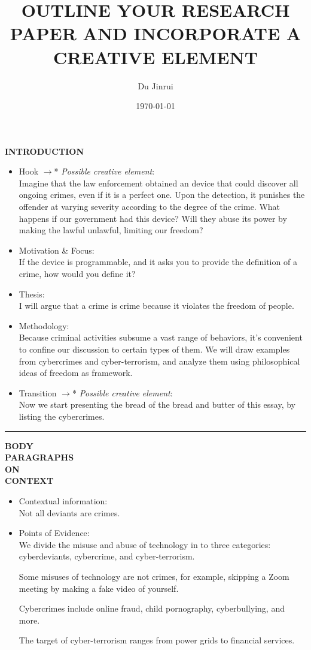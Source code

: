 \documentclass{article}
\title{OUTLINE YOUR RESEARCH PAPER AND INCORPORATE A CREATIVE ELEMENT}
\author{Du Jinrui}
\date{\today}
\begin{document}
\maketitle

\begin{paracol}{3}
	\switchcolumn[0]
	\noindent \textbf{INTRODUCTION}
	\switchcolumn[2]
	\begin{itemize}
	\item Hook $\to$* \textit{Possible creative element}:\\
	Imagine that the law enforcement obtained an device that could discover all ongoing crimes, even if it is a perfect one. Upon the detection, it punishes the offender at varying severity according to the degree of the crime. What happens if our government had this device? Will they abuse its power by making the lawful unlawful, limiting our freedom? 
	\item Motivation \& Focus:\\
	If the device is programmable, and it asks you to provide the definition of a crime, how would you define it?
	\item Thesis:\\
	I will argue that a crime is crime because it violates the freedom of people.
	\item Methodology:\\
	Because criminal activities subsume a vast range of behaviors, it's convenient to confine our discussion to certain types of them. We will draw examples from cybercrimes and cyber-terrorism, and analyze them using philosophical ideas of freedom as framework.
	\item Transition $\to$* \textit{Possible creative element}:\\
	Now we start presenting the bread of the bread and butter of this essay, by listing the cybercrimes.
	\end{itemize}
\end{paracol}
\noindent\rule{16cm}{0.4pt}
{}
\begin{paracol}{3}
	\switchcolumn[0]
	\noindent \textbf{BODY}\\
	\noindent \textbf{PARAGRAPHS}\\
	\noindent \textbf{ON}\\
	\noindent \textbf{CONTEXT}
	\switchcolumn[2]
\begin{itemize}
	\item Contextual information:\\
		Not all deviants are crimes.
	\item Points of Evidence:\\
		We divide the misuse and abuse of technology in to three categories: cyberdeviants, cybercrime, and cyber-terrorism.
		
		Some misuses of technology are not crimes, for example, skipping a Zoom meeting by making a fake video of yourself.

		Cybercrimes include online fraud, child pornography, cyberbullying, and more.

		The target of cyber-terrorism ranges from power grids to financial services.
\end{itemize}
\end{paracol}
\end{document}
